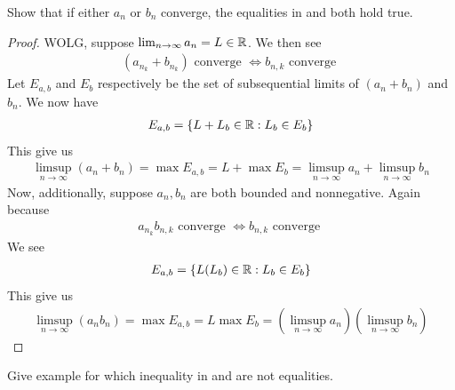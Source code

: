 \documentclass{report}
\begin{document}
\begin{question}{}{}
Show that if either $a_n$ or $b_n$ converge, the equalities in  and   both hold true. 
\end{question}
\begin{proof}
WOLG, suppose $\lim_{n\to \infty}a_n=L\in\mathbb{R}$. We then see 
\begin{align*}
  (a_{n_k}+b_{n_k})\text{ converge }\iff b_{n,k}\text{ converge }
\end{align*}
Let $E_{a,b}$ and $E_b$ respectively be the set of subsequential limits of $(a_n+b_n)$ and $b_n$. We now have 
\begin{align*}
E_{a,b}=\{ L+L_b \in\mathbb{R} : L_b \in E_b \}
\end{align*}
This give us 
\begin{align*}
\limsup_{n\to\infty} (a_n+b_n)=\max E_{a,b}= L+ \max E_b= \limsup_{n\to\infty} a_n +\limsup_{n\to\infty} b_n
\end{align*}
Now, additionally, suppose $a_n,b_n$ are both bounded and nonnegative. Again because 
\begin{align*}
a_{n_k}b_{n,k}\text{ converge }\iff b_{n,k}\text{ converge }
\end{align*}
We see 
\begin{align*}
E_{a,b}=\{ L(L_b)\in\mathbb{R}: L_b \in E_b \}
\end{align*}
This give us 
\begin{align*}
\limsup_{n\to\infty} (a_nb_n)=\max E_{a,b}=L \max E_b= (\limsup_{n\to\infty} a_n)(\limsup_{n\to\infty} b_n)
\end{align*}

\end{proof}
\begin{question}{}{}
Give example for which inequality in  and  are not equalities. 
\end{question}
\end{document}

